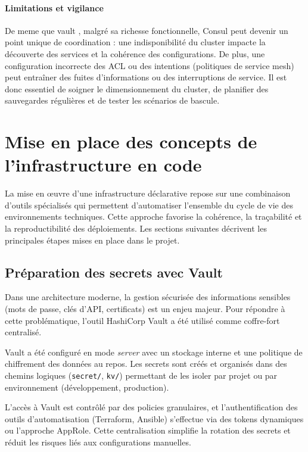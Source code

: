 \paragraph{Limitations et vigilance}

De meme que vault , malgré sa richesse fonctionnelle, Consul peut devenir un point unique de coordination : une indisponibilité du cluster impacte la découverte des services et la cohérence des configurations. De plus, une configuration incorrecte des ACL ou des intentions (politiques de service mesh) peut entraîner des fuites d’informations ou des interruptions de service. Il est donc essentiel de soigner le dimensionnement du cluster, de planifier des sauvegardes régulières et de tester les scénarios de bascule.

\section{Mise en place des concepts de l'infrastructure en code}

La mise en œuvre d'une infrastructure déclarative repose sur une combinaison d'outils spécialisés qui permettent d'automatiser l'ensemble du cycle de vie des environnements techniques. Cette approche favorise la cohérence, la traçabilité et la reproductibilité des déploiements.
Les sections suivantes décrivent les principales étapes mises en place dans le projet.

\subsection{Préparation des secrets avec Vault}

Dans une architecture moderne, la gestion sécurisée des informations sensibles (mots de passe, clés d'API, certificats) est un enjeu majeur.
Pour répondre à cette problématique, l'outil HashiCorp Vault a été utilisé comme coffre-fort centralisé.

Vault a été configuré en mode \textit{server} avec un stockage interne et une politique de chiffrement des données au repos. Les secrets sont créés et organisés dans des chemins logiques (\texttt{secret/}, \texttt{kv/}) permettant de les isoler par projet ou par environnement (développement, production).

L'accès à Vault est contrôlé par des policies granulaires, et l'authentification des outils d'automatisation (Terraform, Ansible) s'effectue via des tokens dynamiques ou l'approche AppRole.
Cette centralisation simplifie la rotation des secrets et réduit les risques liés aux configurations manuelles.

